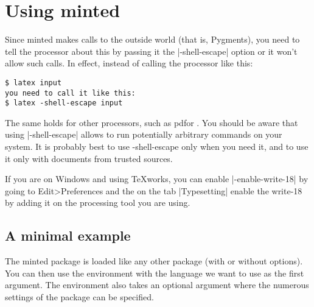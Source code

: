 \section{Using minted}

Since minted makes calls to the outside world (that is, Pygments), you need to
tell the \latex processor about this by passing it the |-shell-escape| option or it
won’t allow such calls. In effect, instead of calling the processor like this:


\begin{verbatim}
$ latex input
you need to call it like this:
$ latex -shell-escape input
\end{verbatim}

The same holds for other processors, such as pdf\latex or \xelatex.
You should be aware that using |-shell-escape| allows \latex to run potentially
arbitrary commands on your system. It is probably best to use -shell-escape
only when you need it, and to use it only with documents from trusted sources.

If you are on Windows and using TeXworks, you can enable |-enable-write-18| by going to Edit>Preferences and the on the tab |Typesetting| enable the write-18 by adding it on the processing tool you are using.



\subsection{A minimal example}   
 
The minted package is loaded like any other package (with or without options). 
You can then use the  environment with the language we want to use
as the first argument. The environment also takes an optional argument where the numerous
settings of the package can be specified.
 


